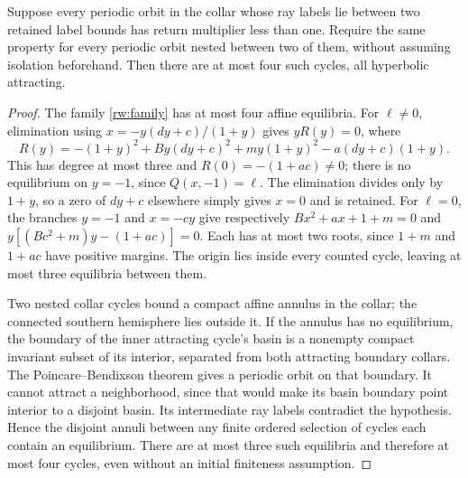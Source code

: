 \begin{lemma}
\label{rw:infinity:attracting-count}
Suppose every periodic orbit in the collar whose ray labels lie
between two retained label bounds has return multiplier less than
one. Require the same property for every periodic orbit nested
between two of them, without assuming isolation beforehand. Then
there are at most four such cycles, all hyperbolic attracting.
\end{lemma}
\begin{proof}
The family \eqref{rw:family} has at most four affine equilibria.
For $\ell\ne0$, elimination using
$x=-y(dy+c)/(1+y)$ gives $yR(y)=0$, where
\[
 R(y)=-(1+y)^2+By(dy+c)^2+my(1+y)^2-a(dy+c)(1+y).
\]
This has degree at most three and $R(0)=-(1+ac)\ne0$;
there is no equilibrium on $y=-1$, since $Q(x,-1)=\ell$.
The elimination divides only by $1+y$, so a zero of $dy+c$
elsewhere simply gives $x=0$ and is retained. For $\ell=0$, the branches
$y=-1$ and $x=-cy$ give respectively
$Bx^2+ax+1+m=0$ and
$y[(Bc^2+m)y-(1+ac)]=0$. Each has at most two roots, since
$1+m$ and $1+ac$ have positive margins. The origin lies inside
every counted cycle, leaving at most three equilibria between them.

Two nested collar cycles bound a compact affine annulus in the collar;
the connected southern hemisphere lies outside it. If the annulus has
no equilibrium, the boundary of the inner attracting cycle's basin
is a nonempty compact invariant subset of its interior, separated from
both attracting boundary collars. The Poincare--Bendixson theorem
\cite[Chapter~7]{Teschl2012} gives a periodic orbit on that boundary.
It cannot attract a neighborhood, since that would make its basin
boundary point interior to a disjoint basin. Its intermediate ray labels
contradict the hypothesis. Hence the disjoint annuli between any finite
ordered selection of cycles each contain an equilibrium. There are at
most three such equilibria and therefore at most four cycles, even
without an initial finiteness assumption.
\end{proof}

